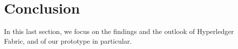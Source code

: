 \section{Conclusion}
In this last section, we focus on the findings and the outlook of Hyperledger Fabric, and of our prototype in particular.




